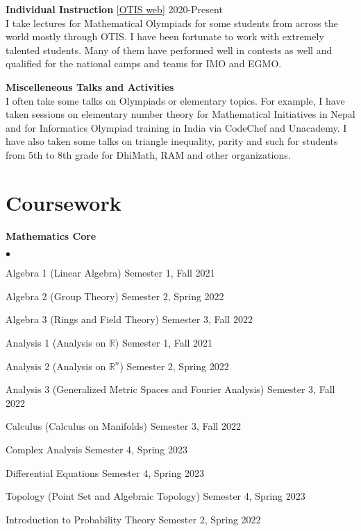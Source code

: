 \documentclass[margin,line, 10pt]{res}
\newenvironment{list2}{
  \begin{list}{$\bullet$}{%
      \setlength{\itemsep}{0in}
      \setlength{\parsep}{0in} \setlength{\parskip}{0in}
      \setlength{\topsep}{0in} \setlength{\partopsep}{0in} 
      \setlength{\leftmargin}{0.2in}}}{\end{list}}
\begin{document}
\begin{resume}
{\bf Individual Instruction} \hspace{1em} [\href{https://web.evanchen.cc/otis.html}{OTIS web}]  \hfill 2020-Present\\
I take lectures for Mathematical Olympiads for some students from across the world mostly through OTIS. I have been fortunate to work with extremely talented students. Many of them have performed well in contests as well and qualified for the national camps and teams for IMO and EGMO.

{\bf Miscelleneous Talks and Activities}\\
I often take some talks on Olympiads or elementary topics. For example, I have taken sessions on elementary number theory for Mathematical Initiatives in Nepal and for Informatics Olympiad training in India via CodeChef and Unacademy. I have also taken some talks on triangle inequality, parity and such for students from 5th to 8th grade for DhiMath, RAM and other organizations. 


\section{\sc Coursework}

{\bf Mathematics Core}
\begin{list2}
    \item Algebra 1 (Linear Algebra) \hfill Semester 1, Fall 2021 
    \item Algebra 2 (Group Theory) \hfill Semester 2, Spring 2022
    \item Algebra 3 (Rings and Field Theory) \hfill Semester 3, Fall 2022
    \item Analysis 1 (Analysis on $\mathbb{R}$) \hfill Semester 1, Fall 2021
    \item Analysis 2 (Analysis on $\mathbb{R}^n$) \hfill Semester 2, Spring 2022
    \item Analysis 3 (Generalized Metric Spaces and Fourier Analysis) \hfill Semester 3, Fall 2022
    \item Calculus (Calculus on Manifolds) \hfill Semester 3, Fall 2022
    \item Complex Analysis \hfill Semester 4, Spring 2023
    \item Differential Equations \hfill Semester 4, Spring 2023
    \item Topology (Point Set and Algebraic Topology) \hfill Semester 4, Spring 2023
    \item Introduction to Probability Theory \hfill Semester 2, Spring 2022
\end{list2}


\end{resume}
\end{document}

